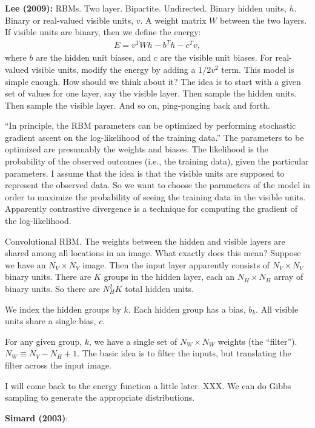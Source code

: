\documentclass[12pt]{article}
\begin{document}
\textbf{Lee (2009):} RBMs.  Two layer.  Bipartite.  Undirected.
Binary hidden units, $h$.  Binary or real-valued visible units, $v$.
A weight matrix $W$ between the two layers.  If visible units are
binary, then we define the energy:
\begin{eqnarray}
  E = v^T W h - b^T h-c^T v,
\end{eqnarray}
where $b$ are the hidden unit biases, and $c$ are the visible unit
biases.  For real-valued visible units, modify the energy by adding a
$1/2 v^2$ term.  This model is simple enough.  How should we think
about it?  The idea is to start with a given set of values for one
layer, say the visible layer.  Then sample the hidden units.  Then
sample the visible layer.  And so on, ping-ponging back and forth.

``In principle, the RBM parameters can be optimized by performing
stochastic gradient ascent on the log-likelihood of the training
data.''  The parameters to be optimized are presumably the weights and
biases.  The likelihood is the probability of the observed outcomes
(i.e., the training data), given the particular parameters.  I assume
that the idea is that the visible units are supposed to represent the
observed data.  So we want to choose the parameters of the model in
order to maximize the probability of seeing the training data in the
visible units.  Apparently contrastive divergence is a technique for
computing the gradient of the log-likelihood.

Convolutional RBM. The weights between the hidden and visible layers
are shared among all locations in an image.  What exactly does this
mean?  Suppose we have an $N_V \times N_V$ image.  Then the input
layer apparently consists of $N_V \times N_V$ binary units.  There are
$K$ groups in the hidden layer, each an $N_H \times N_H$ array of
binary units.  So there are $N_H^2 K$ total hidden units.

We index the hidden groups by $k$.  Each hidden group has a bias,
$b_k$.  All visible units share a single bias, $c$.

For any given group, $k$, we have a single set of $N_W \times N_W$
weights (the ``filter'').  $N_W \equiv N_V-N_H+1$.  The basic idea is
to filter the inputs, but translating the filter across the input
image.

I will come back to the energy function a little later.  XXX.  We can
do Gibbs sampling to generate the appropriate distributions.




\textbf{Simard (2003)}:
\end{document}
